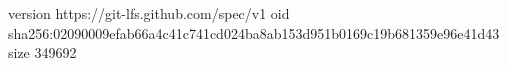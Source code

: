version https://git-lfs.github.com/spec/v1
oid sha256:02090009efab66a4c41c741cd024ba8ab153d951b0169c19b681359e96e41d43
size 349692
